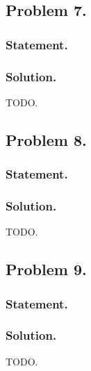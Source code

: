 \subsection{Problem 7.}
\subsubsection{Statement.}
\subsubsection{Solution.}

TODO.

\subsection{Problem 8.}
\subsubsection{Statement.}
\subsubsection{Solution.}

TODO.

\subsection{Problem 9.}
\subsubsection{Statement.}
\subsubsection{Solution.}

TODO.

\EndArticle
